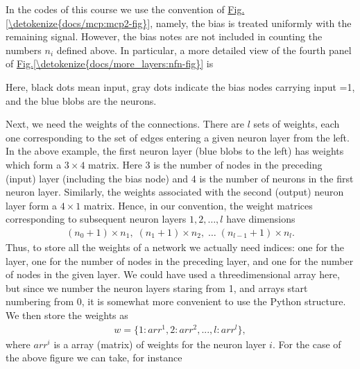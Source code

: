 \documentclass[letterpaper,10pt,english]{jupyterBook}
\begin{document}
\begin{sphinxVerbatim}[commandchars=\\\{\}]
[2, 4, 1]
\end{sphinxVerbatim}

\sphinxAtStartPar
In the codes of this course we use the convention of \hyperref[\detokenize{docs/mcp:mcp2-fig}]{Fig.\@ \ref{\detokenize{docs/mcp:mcp2-fig}}}, namely, the bias is treated uniformly with the remaining signal. However, the bias notes are not included in counting the numbers \(n_i\) defined above. In particular, a more detailed view of the fourth panel of \hyperref[\detokenize{docs/more_layers:nfn-fig}]{Fig.\@ \ref{\detokenize{docs/more_layers:nfn-fig}}} is

\begin{sphinxVerbatim}[commandchars=\\\{\}]
\end{sphinxVerbatim}

\noindent{}

\sphinxAtStartPar
Here, black dots mean input, gray dots indicate the bias nodes carrying input =1, and the blue blobs are the neurons.

\sphinxAtStartPar
Next, we need the weights of the connections. There are \(l\) sets of weights, each one corresponding to the set of edges entering a given neuron layer from the left.
In the above example, the first neuron layer (blue blobs to the left) has weights which form a \(3 \times 4\) matrix. Here 3 is the number of nodes in the preceding (input) layer (including the bias node) and 4 is the number of neurons in the first neuron layer. Similarly, the weights associated with the second (output) neuron layer form a \(4 \times 1\) matrix. Hence, in our convention, the weight matrices corresponding to subsequent neuron layers \(1, 2, \dots, l\) have dimensions
\begin{equation*}
\begin{split}
(n_0+1)\times n_1, \; (n_1+1)\times n_2, \; \dots \; (n_{l-1}+1)\times n_l.
\end{split}
\end{equation*}
\sphinxAtStartPar
Thus, to store all the weights of a network we actually need  indices: one for the layer, one for the number of nodes in the preceding layer, and one for the number of nodes in the given layer. We could have used a three\sphinxhyphen{}dimensional array here, but since we number the neuron layers staring from 1, and arrays start numbering from 0, it is somewhat more convenient to use the Python  structure. We then store the weights as
\begin{equation*}
\begin{split}w=\{1: arr^1, 2: arr^2, ..., l: arr^l\},\end{split}
\end{equation*}
\sphinxAtStartPar
where \(arr^i\) is a  array (matrix) of weights for the neuron layer \(i\). For the case of the above figure we can take, for instance
\end{document}

